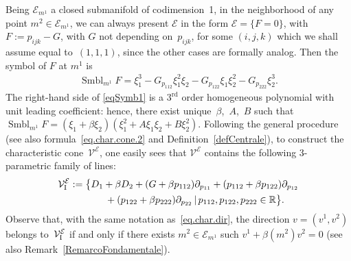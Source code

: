 \documentclass[10pt,a4paper]{amsart}
\newcommand{\R}{\mathbb{R}}
\newcommand{\M}{\mathcal{V}}
\newcommand{\MM}{\mathcal{V}_{\textrm{\normalfont I}}}
\newcommand{\E}{\mathcal{E}}
\newcommand{\Rd}{^\textrm{rd}}
\numberwithin{equation}{section}
\begin{document}
Being $\E_{m^1}$ a closed submanifold of codimension~1, in the neighborhood of any point $m^2\in \E_{m^1}$, we can always present $\E$ in the form $\E=\{F=0\}$, with $F:= p_{ijk}-G$, with $G$ not depending on~$p_{ijk}$, for some $(i,j,k)$ which we shall assume equal to~$(1,1,1)$, since the other cases are formally analog. Then the symbol of $F$ at $m^1$ is
\begin{gather}\label{eqSymb1}
\operatorname{Smbl}_{m^1}F=\xi_1^3-G_{p_{112}}\xi_1^2\xi_2-G_{p_{122}}\xi_1\xi_2^2-G_{p_{222}}\xi_2^3.
\end{gather}
The right-hand side of \eqref{eqSymb1} is a $3\Rd$ order homogeneous polynomial with unit leading coef\/f\/icient: hence, there exist unique~$\beta$,~$A$,~$B$ such that
$\operatorname{Smbl}_{m^1}F=(\xi_1+\beta\xi_2)(\xi_1^2+A\xi_1\xi_2+B\xi_2^2)$.
Following the general procedure (see also formula~\eqref{eq.char.cone.2} and Def\/inition~\ref{defCentrale}), to construct the characteristic cone~$\M^\E$, one easily sees that $\M^\E$ contains
 the following 3-parametric family of lines:
 \begin{gather*}
\MM^\E:=\big\{ D_1+\beta D_2+ (G+\beta p_{112})\partial_{p_{11}}+ (p_{112}+\beta p_{122})\partial_{p_{12}}\\
\hphantom{\MM^\E:=\big\{}{} + (p_{122}+\beta p_{222})\partial_{p_{22}} \,|\, p_{112},p_{122},p_{222}\in \R \big\}.
\end{gather*}
Observe that, with the same notation as~\eqref{eq.char.dir}, the direction $v=(v^1,v^2)$ belongs to~$\MM^\E$ if and only if there exists $m^2\in\E_{m^1}$ such $v^1+\beta (m^2) v^2=0$ (see also Remark~\ref{RemarcoFondamentale}).
\end{document}
